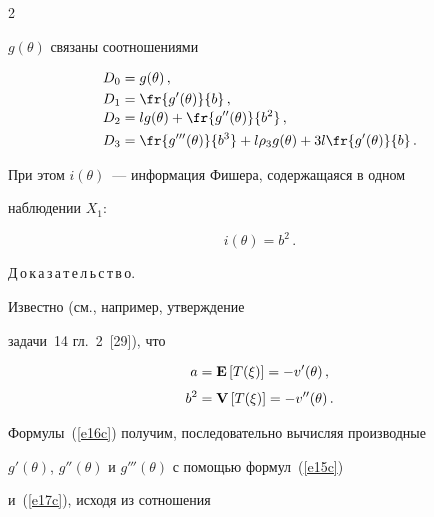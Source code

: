 \begin{multicols}{2}
{  $g(\theta)$ связаны соотношениями


\begin{align} 


D_0&=g(\theta)\,,\notag\\


D_1&=\fr{g'(\theta)}{b}\,,\notag\\[-9pt]


&\label{e16c}\\[-9pt]


D_2&=l g(\theta)+\fr{g''(\theta)}{b^2}\,,\notag\\


D_3&=\fr{g'''(\theta)}{b^3}+l\rho_3 g(\theta)+


     3l\fr{g'(\theta)}{b}\,.\notag


\end{align}


  При этом $i(\theta)$~--- информация Фишера, содержащаяся в одном


  наблюдении $X_1$: 


  $$


  i(\theta)=b^2\,.


  $$


   }










\noindent


Д\,о\,к\,а\,з\,а\,т\,е\,л\,ь\,с\,т\,в\,о. 


Известно (см., например, утверждение


  задачи~14 гл.~2~[29]), что


  \begin{align}


 a&={\bf E}\left[T(\xi) \right]=-v'(\theta)\,,\notag\\[-6pt]


 & \label{e17c}\\[-6pt]


      b^2&={\bf V}\left[T(\xi) \right]=-v''(\theta)\,.\notag


\end{align}


  Формулы~(\ref{e16c}) получим, последовательно вычисляя производные


  $g'(\theta)$, $g''(\theta)$ и $g'''(\theta)$ с помощью формул~(\ref{e15c}) 


и~(\ref{e17c}), исходя из сотношения



\end{multicols}
